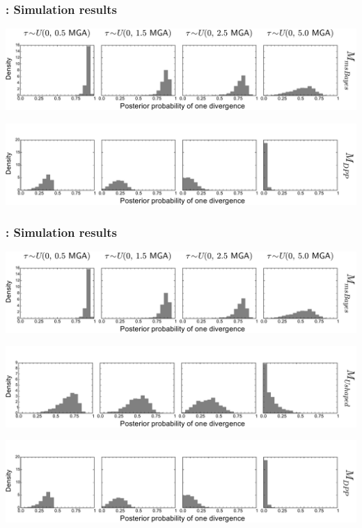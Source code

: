 \begin{frame}[t]
    \frametitle{\dppmsbayes: Simulation results}
    \vspace{1cm}
        \centerline{
        \includegraphics[width=1.13\textwidth]{../images/old_old_power_psi_prob.pdf}}
        \vspace{0mm}
        \centerline{
        \includegraphics[width=1.13\textwidth]{../images/old_dpp_power_psi_prob_headless.pdf}}
\end{frame}

\begin{frame}
    \frametitle{\dppmsbayes: Simulation results}
        \centerline{
        \includegraphics[width=\textwidth]{../images/old_old_power_psi_prob.pdf}}
        \vspace{0mm}
        \centerline{
        \includegraphics[width=\textwidth]{../images/old_u-shaped_power_psi_prob_headless.pdf}}
        \vspace{0mm}
        \centerline{
        \includegraphics[width=\textwidth]{../images/old_dpp_power_psi_prob_headless.pdf}}
\end{frame}

